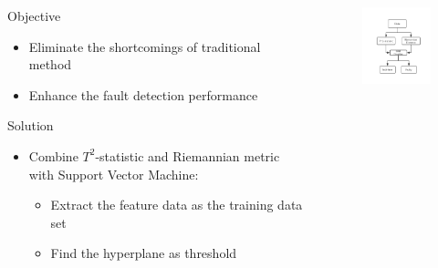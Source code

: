 \documentclass[10pt]{beamer}
\begin{document}
\begin{frame}

 \begin{columns}
             \begin{column}{0.7\textwidth}
     \begin{exampleblock}{Objective}
      \begin{itemize}
      \item Eliminate the shortcomings of traditional method
      \item Enhance the fault detection performance
 	 \end{itemize}  
 	 \end{exampleblock}
 \begin{exampleblock}{Solution}
      \begin{itemize}
      \item Combine  $T^2$-statistic and Riemannian metric with Support Vector Machine:
       \begin{itemize}
         \item  Extract the feature data as the training data set
          \item Find the hyperplane as threshold
          \end{itemize}
 	 	 \end{itemize}  
 	 \end{exampleblock}   
           \end{column}
        \begin{column}{0.3\textwidth}  %
        \begin{figure}
            \centering
            \includegraphics[width=4cm]{fig/process.png}
        \end{figure}
  
        \end{column}
    \end{columns}

\end{frame}
\end{document}
